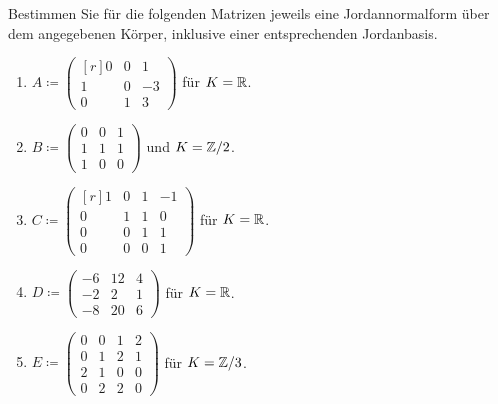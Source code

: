 \documentclass[a4paper, 10pt]{scrartcl}
\begin{document}
\begin{question}
  Bestimmen Sie für die folgenden Matrizen jeweils eine Jordannormalform über dem angegebenen Körper, inklusive einer entsprechenden Jordanbasis.
  \begin{enumerate}
    \item
      $
      A
      \coloneqq
      \begin{pmatrix*}[r]
        0 & 0 &  1  \\
        1 & 0 & -3  \\
        0 & 1 &  3
      \end{pmatrix*}
      $
      für $K = \mathbb{R}$.
    \item
      $
      B
      \coloneqq
      \begin{pmatrix}
        0 & 0 & 1 \\
        1 & 1 & 1 \\
        1 & 0 & 0
      \end{pmatrix}
      $
      und $K = \mathbb{Z}/2$.
    \item
      $
      C
      \coloneqq
      \begin{pmatrix*}[r]
        1 & 0 & 1 & -1  \\
        0 & 1 & 1 &  0  \\
        0 & 0 & 1 &  1  \\
        0 & 0 & 0 &  1
      \end{pmatrix*}
      $
      für $K = \mathbb{R}$.
    \item
      $
      D
      \coloneqq
      \begin{pmatrix}
        -6 & 12 & 4 \\
        -2 &  2 & 1 \\
        -8 & 20 & 6
      \end{pmatrix}
      $
      für $K = \mathbb{R}$.
    \item
      $
      E
      \coloneqq
      \begin{pmatrix}
        0 & 0 & 1 & 2 \\
        0 & 1 & 2 & 1 \\
        2 & 1 & 0 & 0 \\
        0 & 2 & 2 & 0
      \end{pmatrix}
      $
      für $K = \mathbb{Z}/3$.
  \end{enumerate}
\end{question}
\end{document}
